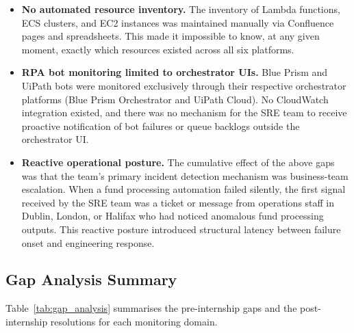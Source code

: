 \begin{itemize}
    \item \textbf{No automated resource inventory.} The inventory of
          Lambda functions, ECS clusters, and EC2 instances was
          maintained manually via Confluence pages and spreadsheets.
          This made it impossible to know, at any given moment, exactly
          which resources existed across all six platforms.

    \item \textbf{RPA bot monitoring limited to orchestrator UIs.}
          Blue Prism and UiPath bots were monitored exclusively through
          their respective orchestrator platforms (Blue Prism Orchestrator and
          UiPath Cloud). No CloudWatch integration existed, and there
          was no mechanism for the SRE team to receive proactive
          notification of bot failures or queue backlogs outside the
          orchestrator UI.

    \item \textbf{Reactive operational posture.} The cumulative effect
          of the above gaps was that the team's primary incident
          detection mechanism was business-team escalation. When a fund
          processing automation failed silently, the first signal
          received by the SRE team was a ticket or message from
          operations staff in Dublin, London, or Halifax who had noticed
          anomalous fund processing outputs. This reactive posture
          introduced structural latency between failure onset and
          engineering response.
\end{itemize}

\subsection{Gap Analysis Summary}

Table~\ref{tab:gap_analysis} summarises the pre-internship gaps and the
post-internship resolutions for each monitoring domain.

